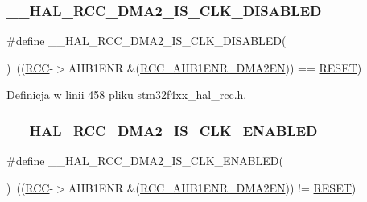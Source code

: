 \subsubsection{\texorpdfstring{\+\_\+\+\_\+\+H\+A\+L\+\_\+\+R\+C\+C\+\_\+\+D\+M\+A2\+\_\+\+I\+S\+\_\+\+C\+L\+K\+\_\+\+D\+I\+S\+A\+B\+L\+ED}{\_\_HAL\_RCC\_DMA2\_IS\_CLK\_DISABLED}}
{\footnotesize\ttfamily \#define \+\_\+\+\_\+\+H\+A\+L\+\_\+\+R\+C\+C\+\_\+\+D\+M\+A2\+\_\+\+I\+S\+\_\+\+C\+L\+K\+\_\+\+D\+I\+S\+A\+B\+L\+ED(\begin{DoxyParamCaption}{ }\end{DoxyParamCaption})~((\hyperlink{group___peripheral__declaration_ga74944438a086975793d26ae48d5882d4}{R\+CC}-\/$>$A\+H\+B1\+E\+NR \&(\hyperlink{group___peripheral___registers___bits___definition_ga664a5d572a39a0c084e4ee7c1cf7df0d}{R\+C\+C\+\_\+\+A\+H\+B1\+E\+N\+R\+\_\+\+D\+M\+A2\+EN})) == \hyperlink{group___exported__types_gga89136caac2e14c55151f527ac02daaffa589b7d94a3d91d145720e2fed0eb3a05}{R\+E\+S\+ET})}



Definicja w linii 458 pliku stm32f4xx\+\_\+hal\+\_\+rcc.\+h.

\mbox{\label{group___r_c_c___a_h_b1___peripheral___clock___enable___disable___status_gad0ccdaf669ea327e80c455db4dc36177}} 
\subsubsection{\texorpdfstring{\+\_\+\+\_\+\+H\+A\+L\+\_\+\+R\+C\+C\+\_\+\+D\+M\+A2\+\_\+\+I\+S\+\_\+\+C\+L\+K\+\_\+\+E\+N\+A\+B\+L\+ED}{\_\_HAL\_RCC\_DMA2\_IS\_CLK\_ENABLED}}
{\footnotesize\ttfamily \#define \+\_\+\+\_\+\+H\+A\+L\+\_\+\+R\+C\+C\+\_\+\+D\+M\+A2\+\_\+\+I\+S\+\_\+\+C\+L\+K\+\_\+\+E\+N\+A\+B\+L\+ED(\begin{DoxyParamCaption}{ }\end{DoxyParamCaption})~((\hyperlink{group___peripheral__declaration_ga74944438a086975793d26ae48d5882d4}{R\+CC}-\/$>$A\+H\+B1\+E\+NR \&(\hyperlink{group___peripheral___registers___bits___definition_ga664a5d572a39a0c084e4ee7c1cf7df0d}{R\+C\+C\+\_\+\+A\+H\+B1\+E\+N\+R\+\_\+\+D\+M\+A2\+EN})) != \hyperlink{group___exported__types_gga89136caac2e14c55151f527ac02daaffa589b7d94a3d91d145720e2fed0eb3a05}{R\+E\+S\+ET})}



